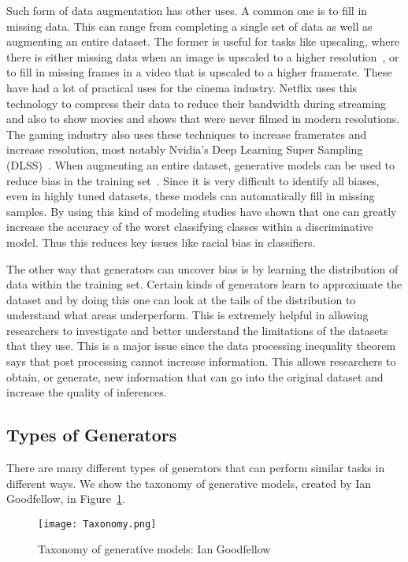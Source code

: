 Such form of data augmentation has other uses. A common one is to fill in
missing data. This can range from completing a single set of data as well as
augmenting an entire dataset. The former is useful for tasks like upscaling,
where there is either missing data when an image is upscaled to a higher
resolution~\cite{}, or to fill in missing frames in a video that is upscaled to
a higher framerate. These have had a lot of practical uses for the cinema
industry. Netflix uses this technology to compress their data to reduce their
bandwidth during streaming and also to show movies and shows that were never
filmed in modern resolutions. The gaming industry also uses these techniques to
increase framerates and increase resolution, most notably Nvidia's Deep Learning
Super Sampling (DLSS)~\cite{}. When augmenting an entire dataset, generative
models can be used to reduce bias in the training set~\cite{}. Since it is very
difficult to identify all biases, even in highly tuned datasets, these models
can automatically fill in missing samples. By using this kind of modeling
studies have shown that one can greatly increase the accuracy of the worst
classifying classes within a discriminative model. Thus this reduces key issues
like racial bias in classifiers. 

The other way that generators can uncover bias is by learning the distribution
of data within the training set. Certain kinds of generators learn to
approximate the dataset and by doing this one can look at the tails of the
distribution to understand what areas underperform. This is extremely helpful in
allowing researchers to investigate and better understand the limitations of the
datasets that they use. This is a major issue since the data processing
inequality theorem says that post processing cannot increase information. This
allows researchers to obtain, or generate, new information that can go into the
original dataset and increase the quality of inferences.

\subsection{Types of Generators}
There are many different types of generators that can perform similar tasks in
different ways. We show the taxonomy of generative models, created by Ian
Goodfellow, in Figure~\ref{fig:tax}. 

\begin{figure}[ht]
\centering
\texttt{[image: Taxonomy.png]}
\caption{Taxonomy of generative models: Ian Goodfellow}
\label{fig:tax}
\end{figure}

